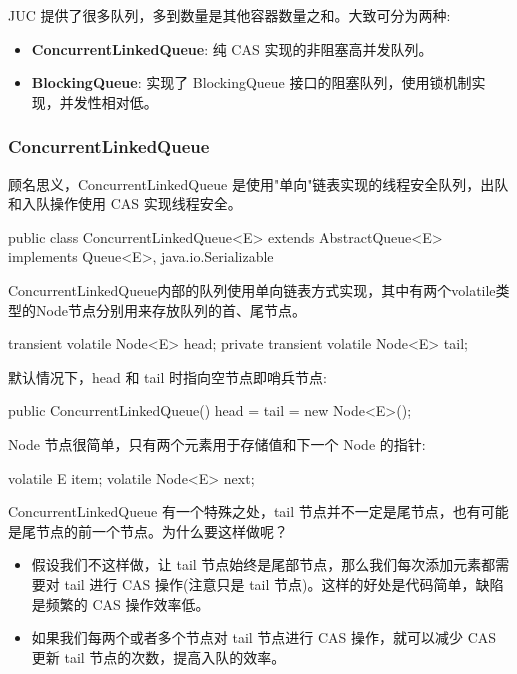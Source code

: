 JUC 提供了很多队列，多到数量是其他容器数量之和。大致可分为两种:
\begin{itemize}
    \item \textbf{ConcurrentLinkedQueue}: 纯 CAS 实现的非阻塞高并发队列。
    \item \textbf{BlockingQueue}: 实现了 BlockingQueue 接口的阻塞队列，使用锁机制实现，并发性相对低。
\end{itemize}

\subsubsection{ConcurrentLinkedQueue}

顾名思义，ConcurrentLinkedQueue 是使用"单向"链表实现的线程安全队列，出队和入队操作使用 CAS 实现线程安全。

\begin{Java}
public class ConcurrentLinkedQueue<E> extends AbstractQueue<E> implements Queue<E>, java.io.Serializable
\end{Java}

ConcurrentLinkedQueue内部的队列使用单向链表方式实现，其中有两个volatile类型的Node节点分别用来存放队列的首、尾节点。

\begin{Java}
transient volatile Node<E> head;
private transient volatile Node<E> tail;
\end{Java}

默认情况下，head 和 tail 时指向空节点即哨兵节点:

\begin{Java}
public ConcurrentLinkedQueue() {
    head = tail = new Node<E>();
}
\end{Java}

Node 节点很简单，只有两个元素用于存储值和下一个 Node 的指针:

\begin{Java}
volatile E item;
volatile Node<E> next;
\end{Java}

ConcurrentLinkedQueue 有一个特殊之处，tail 节点并不一定是尾节点，也有可能是尾节点的前一个节点。为什么要这样做呢？

\begin{itemize}
    \item 假设我们不这样做，让 tail 节点始终是尾部节点，那么我们每次添加元素都需要对 tail 进行 CAS 操作(注意只是 tail 节点)。这样的好处是代码简单，缺陷是频繁的 CAS 操作效率低。
    \item 如果我们每两个或者多个节点对 tail 节点进行 CAS 操作，就可以减少 CAS 更新 tail 节点的次数，提高入队的效率。
\end{itemize}

